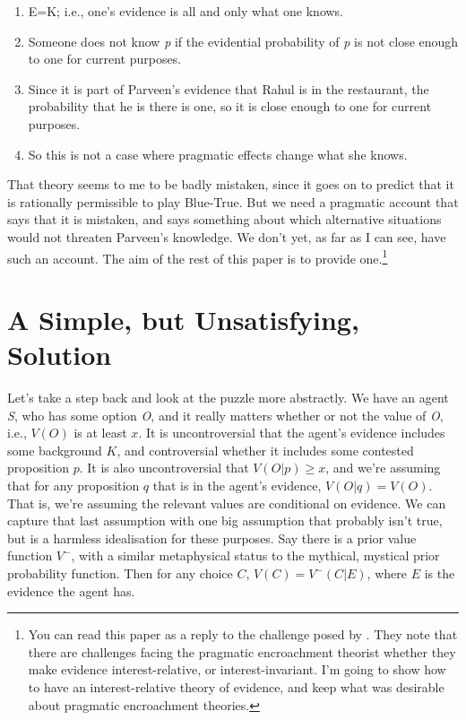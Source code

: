 \begin{enumerate}
\item E=K; i.e., one's evidence is all and only what one knows.

\item Someone does not know \emph{p} if the evidential probability of \emph{p} is not close enough to one for current purposes.

\item Since it is part of Parveen's evidence that Rahul is in the restaurant, the probability that he is there is one, so it is close enough to one for current purposes.

\item So this is not a case where pragmatic effects change what she knows.

\end{enumerate}
That theory seems to me to be badly mistaken, since it goes on to predict that it is rationally permissible to play Blue-True. But we need a pragmatic account that says that it is mistaken, and says something about which alternative situations would not threaten Parveen's knowledge. We don't yet, as far as I can see, have such an account. The aim of the rest of this paper is to provide one.\footnote{You can read this paper as a reply to the challenge posed by \citet{IchikawaEtAl2012}. They note that there are challenges facing the pragmatic encroachment theorist whether they make evidence interest-relative, or interest-invariant. I'm going to show how to have an interest-relative theory of evidence, and keep what was desirable about pragmatic encroachment theories.}

\section{A Simple, but Unsatisfying, Solution}
\label{asimplebutunsatisfyingsolution}

Let's take a step back and look at the puzzle more abstractly. We have an agent \emph{S}, who has some option \emph{O}, and it really matters whether or not the value of \emph{O}, i.e., $V(O)$ is at least $x$. It is uncontroversial that the agent's evidence includes some background $K$, and controversial whether it includes some contested proposition $p$. It is also uncontroversial that $V(O | p) \geq x$, and we're assuming that for any proposition $q$ that is in the agent's evidence, $V(O | q) = V(O)$. That is, we're assuming the relevant values are conditional on evidence. We can capture that last assumption with one big assumption that probably isn't true, but is a harmless idealisation for these purposes. Say there is a prior value function $V^-$, with a similar metaphysical status to the mythical, mystical prior probability function. Then for any choice $C$, $V(C) = V^-(C | E)$, where $E$ is the evidence the agent has.

